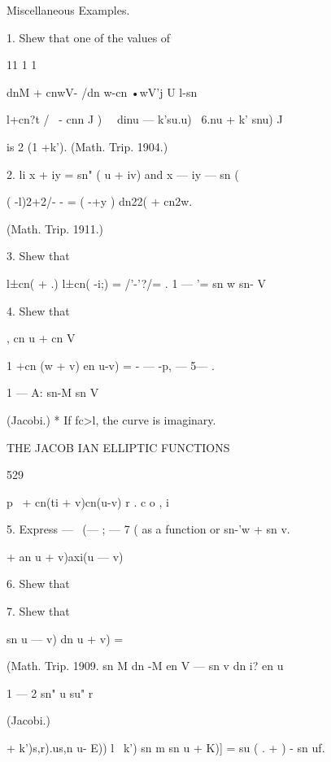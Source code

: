 Miscellaneous Examples. 

1. Shew that one of the values of 



11 1 1 

dnM + cnwV- /dn w-cn •wV'j U l-sn%

l+cn?t / \  - cnn J ) \ \  dinu — k'su.u) \ 6.nu + k' snu) J 



is 2 (1 +k'). (Math. Trip. 1904.) 

2. li x + iy = sn"  ( u + iv) and x — iy — sn  (%

 ( -l)2+2/- - = ( -+y ) dn22( + cn2w. 

(Math. Trip. 1911.) 

3. Shew that 

 l±cn(  +  .)  l±cn( -i;)  = /'-'?/=  . 
  1 —  '= sn  w sn- V 

4. Shew that 

, cn  u + cn  V 

1 +cn (w + v) en  u-v) = - — -p, —   5— . 

  1 — A: sn-M sn  V 

(Jacobi.) 
* If fc>l, the curve is imaginary. 



THE JACOB IAN ELLIPTIC FUNCTIONS 



529 



p \ + cn(ti + v)cn(u-v) r .  c o , i 

5. Express   — \ (— ; — 7 ( as a function or sn-'w + sn  v. 

   + an u + v)axi(u — v) 



6. Shew that 



7. Shew that 



sn  u — v) dn  u + v) = 



(Math. Trip. 1909. 
sn M dn -M en V — sn v dn i? en u 



1 —  2 sn"  u su"  r 



(Jacobi.) 



    + k')s,r).us,n u- E))   l~ k') sn m sn  u + K)] =  su ( . +  ) - sn uf. 

